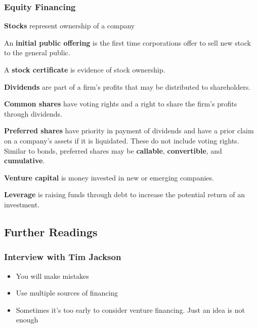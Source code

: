 \documentclass[english, 12pt]{article}
\begin{document}
\subsubsection*{Equity Financing}
\begin{defn}
\textbf{Stocks} represent ownership of a company
\end{defn}
\begin{defn}[IPO]
An \textbf{initial public offering} is the first time corporations offer to sell new stock to the general public.
\end{defn}
\begin{defn}
A \textbf{stock certificate} is evidence of stock ownership.
\end{defn}
\begin{defn}
\textbf{Dividends} are part of a firm's profits that may be distributed to shareholders.
\end{defn}
\begin{defn}
\textbf{Common shares} have voting rights and a right to share the firm's profits through dividends.
\end{defn}
\begin{defn}
\textbf{Preferred shares} have priority in payment of dividends and have a prior claim on a company's assets if it is liquidated. These do not include voting rights. Similar to bonds, preferred shares may be \textbf{callable}, \textbf{convertible}, and \textbf{cumulative}.
\end{defn}
\begin{defn}
\textbf{Venture capital} is money invested in new or emerging companies.
\end{defn}
\begin{defn}
\textbf{Leverage} is raising funds through debt to increase the potential return of an investment.
\end{defn}
\subsection*{Further Readings}
\subsubsection*{Interview with Tim Jackson}
\begin{itemize}
\item You will make mistakes
\item Use multiple sources of financing
\item Sometimes it's too early to consider venture financing. Just an idea is not enough
\end{itemize}
\end{document}

